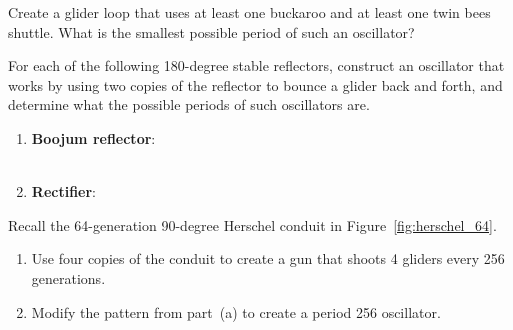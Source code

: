 \begin{multicols}{2}
\begin{problemstar}
		\begin{center}
		\end{center}
	\end{problemstar}
	
	
	\mfilbreak
	
	
	\begin{problem}\label{exer:buckaroo_loop} 
		Create a glider loop that uses at least one buckaroo and at least one twin bees shuttle. What is the smallest possible period of such an oscillator? %
	\end{problem}
	
	
	\mfilbreak
	
	
	\begin{problem}\label{exer:new_reflectors} 
		For each of the following 180-degree stable reflectors, construct an oscillator that works by using two copies of the reflector to bounce a glider back and forth, and determine what the possible periods of such oscillators are.\smallskip
		
		\begin{enumerate}[label=\bf\color{ocre}(\alph*)]
			\item \textbf{Boojum reflector}: \\ \\[0.5em]
			
			\item \textbf{Rectifier}: \\ 
		\end{enumerate}
	\end{problem}
	
	
	\mfilbreak
	
	
	\begin{problem}\label{exer:machine_gun} 
		Recall the 64-generation 90-degree Herschel conduit in Figure~\ref{fig:herschel_64}.\smallskip
		
		\begin{enumerate}[label=\bf\color{ocre}(\alph*)]
			\item Use four copies of the conduit to create a gun that shoots 4 gliders every 256 generations.
			
			\item Modify the pattern from part~(a) to create a period 256 oscillator. %
			

\end{enumerate}
\end{problem}
\end{multicols}
